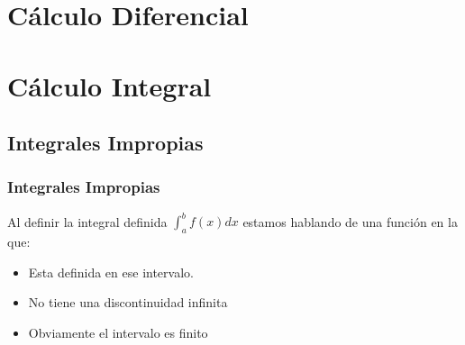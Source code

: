 \documentclass[12pt, fleqn]{report}                             %
\theoremstyle{break}                                            %
\begin{document}
                    




\part{Cálculo Diferencial}






\part{Cálculo Integral}

    \chapter{Integrales Impropias}
        \clearpage

        \section{Integrales Impropias}

            Al definir la integral definida $\int_a^b f(x) dx$ estamos hablando
            de una función en la que:

            \begin{itemize}
                \item Esta definida en ese intervalo.
                \item No tiene una discontinuidad infinita
                \item Obviamente el intervalo es finito
            \end{itemize}
\end{document}
